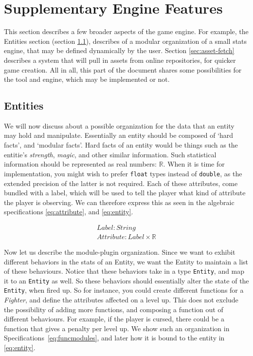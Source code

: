 \section{Supplementary Engine Features}

This section describes a few broader aspects of the game engine. For
example, the Entities section (section \ref{sec:entities}), describes of a
modular organization of a small stats engine, that may be defined dynamically by
the user. Section \ref{sec:asset-fetch} describes a system that will pull in
assets from online repositories, for quicker game creation. All in all, this
part of the document shares some possibilities for the tool and engine, which
may be implemented or not.

\subsection{Entities}
\label{sec:entities}

We will now discuss about a possible organization for the data that an entity
may hold and manipulate. Essentially an entity should be composed of `hard
facts', and `modular facts'. Hard facts of an entity would be things such as the
entitie's \textit{strength}, \textit{magic}, and other similar information. Such
statistical information should be represented as real numbers: $\mathbb{R}$.
When it is time for implementation, you might wish to prefer \texttt{float}
types instead of \texttt{double}, as the extended precision of the latter is not
required. Each of these attributes, come bundled with a label, which will be
used to tell the player what kind of attribute the player is observing. We can
therefore express this as seen in the algebraic specifications
\ref{eq:attribute}, and \ref{eq:entity}.

\begin{equation}
\begin{split}
  \label{eq:attribute}
  Label\colon String \\
  Attribute\colon Label \times \mathbb{R}
\end{split}
\end{equation}

Now let us describe the module-plugin organization. Since we want to exhibit
different behaviors in the stats of an Entity, we want the Entity to maintain
a list of these behaviours. Notice that these behaviors take in a type
\texttt{Entity}, and map it to an \texttt{Entity} as well. So these behaviors
should essentially alter the state of the \texttt{Entity}, when fired up. So for
instance, you could create different functions for a \textit{Fighter}, and
define the attributes affected on a level up. This does not exclude the
possibility of adding more functions, and composing a function out of different
behaviours. For example, if the player is cursed, there could be a function that
gives a penalty per level up. We show such an organization in
Specifications~\ref{eq:funcmodules}, and later how it is bound to the entity in
\ref{eq:entity}.

